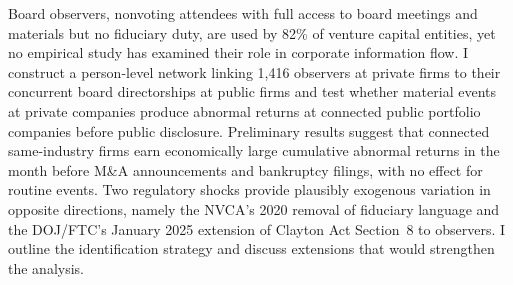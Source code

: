 Board observers, nonvoting attendees with full access to board meetings and materials but no fiduciary duty, are used by 82\% of venture capital entities, yet no empirical study has examined their role in corporate information flow. I construct a person-level network linking 1,416 observers at private firms to their concurrent board directorships at public firms and test whether material events at private companies produce abnormal returns at connected public portfolio companies before public disclosure. Preliminary results suggest that connected same-industry firms earn economically large cumulative abnormal returns in the month before M\&A announcements and bankruptcy filings, with no effect for routine events. Two regulatory shocks provide plausibly exogenous variation in opposite directions, namely the NVCA's 2020 removal of fiduciary language and the DOJ/FTC's January 2025 extension of Clayton Act Section~8 to observers. I outline the identification strategy and discuss extensions that would strengthen the analysis.